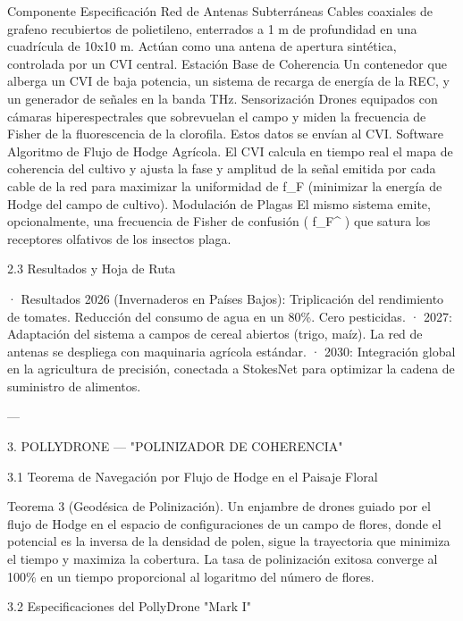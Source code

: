 \documentclass[12pt,twoside]{book}
\begin{document}
Componente Especificación
Red de Antenas Subterráneas Cables coaxiales de grafeno recubiertos de polietileno, enterrados a 1 m de profundidad en una cuadrícula de 10x10 m. Actúan como una antena de apertura sintética, controlada por un CVI central.
Estación Base de Coherencia Un contenedor que alberga un CVI de baja potencia, un sistema de recarga de energía de la REC, y un generador de señales en la banda THz.
Sensorización Drones equipados con cámaras hiperespectrales que sobrevuelan el campo y miden la frecuencia de Fisher de la fluorescencia de la clorofila. Estos datos se envían al CVI.
Software Algoritmo de Flujo de Hodge Agrícola. El CVI calcula en tiempo real el mapa de coherencia del cultivo y ajusta la fase y amplitud de la señal emitida por cada cable de la red para maximizar la uniformidad de  f_F  (minimizar la energía de Hodge del campo de cultivo).
Modulación de Plagas El mismo sistema emite, opcionalmente, una frecuencia de Fisher de confusión ( f_F^{} ) que satura los receptores olfativos de los insectos plaga.

2.3 Resultados y Hoja de Ruta

· Resultados 2026 (Invernaderos en Países Bajos): Triplicación del rendimiento de tomates. Reducción del consumo de agua en un 80\%. Cero pesticidas.
· 2027: Adaptación del sistema a campos de cereal abiertos (trigo, maíz). La red de antenas se despliega con maquinaria agrícola estándar.
· 2030: Integración global en la agricultura de precisión, conectada a StokesNet para optimizar la cadena de suministro de alimentos.

---

3. POLLYDRONE — "POLINIZADOR DE COHERENCIA"

3.1 Teorema de Navegación por Flujo de Hodge en el Paisaje Floral

Teorema 3 (Geodésica de Polinización). Un enjambre de drones guiado por el flujo de Hodge en el espacio de configuraciones de un campo de flores, donde el potencial es la inversa de la densidad de polen, sigue la trayectoria que minimiza el tiempo y maximiza la cobertura. La tasa de polinización exitosa converge al 100\% en un tiempo proporcional al logaritmo del número de flores.

3.2 Especificaciones del PollyDrone "Mark I"
\end{document}
